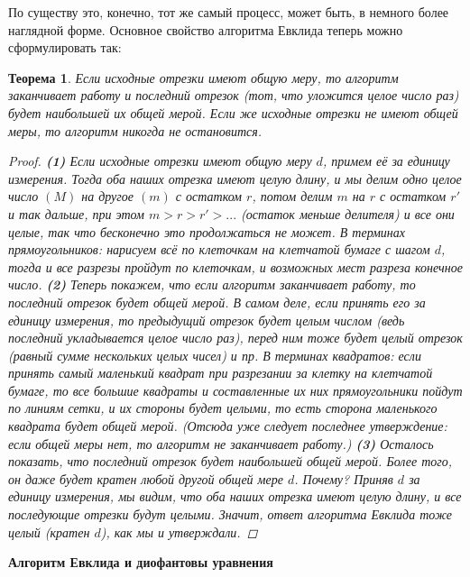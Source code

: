 \documentclass{article}
\newtheorem{theorem}{Теорема}
\begin{document}
По существу это, конечно, тот же самый процесс, может быть, в немного более наглядной форме.
\newline
Основное свойство алгоритма Евклида теперь можно сформулировать так:
\begin{theorem}
Если исходные отрезки имеют общую меру, то алгоритм заканчивает работу и последний отрезок (тот, что уложится целое число раз) будет наибольшей их общей мерой. Если же исходные отрезки не имеют общей меры, то алгоритм никогда не остановится.
\begin{proof}
\textbf{(1) } Если исходные отрезки имеют общую меру $d$, примем её за единицу измерения. Тогда оба наших отрезка имеют целую длину, и мы делим одно целое число $(M)$ на другое $(m)$ с остатком $r$, потом делим $m$ на $r$ с остатком $r'$ и так дальше, при этом $m > r > r' > ...$ (остаток меньше делителя) и все они целые, так что бесконечно это продолжаться не может. В терминах прямоугольников: нарисуем всё по клеточкам на клетчатой бумаге с шагом $d$, тогда и все разрезы пройдут по клеточкам, и возможных мест разреза конечное число.
\newline
\newline
\textbf{(2) } Теперь покажем, что если алгоритм заканчивает работу, то последний отрезок будет общей мерой. В самом деле, если принять его за единицу измерения, то предыдущий отрезок будет целым числом (ведь последний укладывается целое число раз), перед ним тоже будет целый отрезок (равный сумме нескольких целых чисел) и пр. В терминах квадратов: если принять самый маленький квадрат при разрезании за клетку на клетчатой бумаге, то все большие квадраты и составленные их них прямоугольники пойдут по линиям сетки, и их стороны будет целыми, то есть сторона маленького квадрата будет общей мерой. (Отсюда уже следует последнее утверждение: если общей меры нет, то алгоритм не заканчивает работу.)
\newline
\newline
\textbf{(3) } Осталось показать, что последний отрезок будет наибольшей общей мерой. Более того, он даже будет кратен любой другой общей мере $d$. Почему? Приняв $d$ за единицу измерения, мы видим, что оба наших отрезка имеют целую длину, и все последующие отрезки будут целыми. Значит, ответ алгоритма Евклида тоже целый (кратен $d$), как мы и утверждали.
\end{proof}
\end{theorem}
\textbf{Алгоритм Евклида и диофантовы уравнения}
\end{document}
